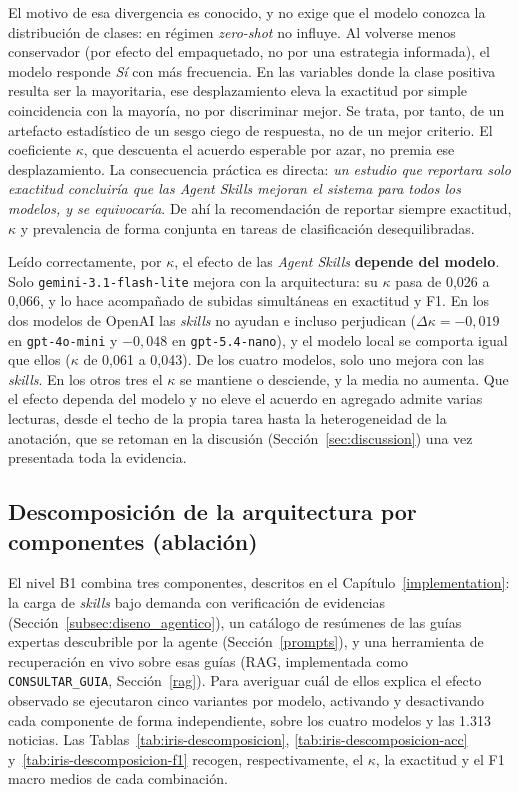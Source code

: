 El motivo de esa divergencia es conocido, y no exige que el modelo conozca la
distribución de clases: en régimen \textit{zero-shot} no influye. Al volverse menos
conservador (por efecto del empaquetado, no por una estrategia informada), el modelo
responde \textit{Sí} con más frecuencia. En las variables donde la clase positiva
resulta ser la mayoritaria, ese desplazamiento eleva la exactitud por simple
coincidencia con la mayoría, no por discriminar mejor. Se trata, por tanto, de un
artefacto estadístico de un sesgo ciego de respuesta, no de un mejor criterio. El
coeficiente $\kappa$, que descuenta el acuerdo esperable por azar, no premia ese
desplazamiento. La consecuencia práctica
es directa: \emph{un estudio que reportara solo exactitud concluiría que las Agent
Skills mejoran el sistema para todos los modelos, y se equivocaría}. De ahí la recomendación de reportar
siempre exactitud, $\kappa$ y prevalencia de forma conjunta en tareas de
clasificación desequilibradas.

Leído correctamente, por $\kappa$, el efecto de las \textit{Agent Skills}
\textbf{depende del modelo}. Solo \texttt{gemini-3.1-flash-lite} mejora con la
arquitectura: su $\kappa$ pasa de 0,026 a 0,066, y lo hace acompañado de subidas
simultáneas en exactitud y F1. En los dos modelos de OpenAI las \textit{skills} no ayudan e incluso
perjudican ($\Delta\kappa = -0,019$ en \texttt{gpt-4o-mini} y $-0,048$ en
\texttt{gpt-5.4-nano}), y el modelo local se comporta igual que ellos ($\kappa$ de
0,061 a 0,043). De los cuatro modelos, solo uno mejora con las \textit{skills}. En
los otros tres el $\kappa$ se mantiene o desciende, y la media no aumenta. Que el
efecto dependa del modelo y no eleve el acuerdo en agregado admite varias lecturas, desde el techo de la propia tarea hasta la heterogeneidad de la anotación, que se
retoman en la discusión (Sección~\ref{sec:discussion}) una vez presentada toda la
evidencia.

\subsection{Descomposición de la arquitectura por componentes (ablación)}
\label{subsec:iris_descomposicion}

El nivel B1 combina tres componentes, descritos en el Capítulo~\ref{implementation}:
la carga de \textit{skills} bajo demanda con verificación de evidencias
(Sección~\ref{subsec:diseno_agentico}), un catálogo de resúmenes de las guías
expertas descubrible por la agente (Sección~\ref{prompts}), y una herramienta de
recuperación en vivo sobre esas guías (RAG, implementada como \texttt{CONSULTAR\_GUIA},
Sección~\ref{rag}). Para averiguar cuál de ellos explica el efecto
observado se ejecutaron cinco variantes por modelo, activando y desactivando cada
componente de forma independiente, sobre los cuatro modelos y las 1.313 noticias.
Las Tablas~\ref{tab:iris-descomposicion}, \ref{tab:iris-descomposicion-acc}
y~\ref{tab:iris-descomposicion-f1} recogen, respectivamente, el $\kappa$, la
exactitud y el F1 macro medios de cada combinación.

